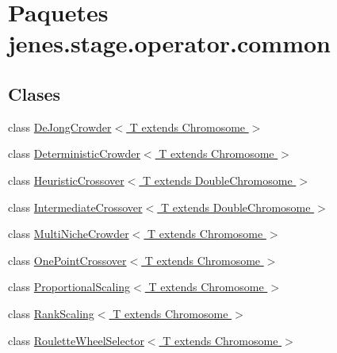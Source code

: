 \hypertarget{namespacejenes_1_1stage_1_1operator_1_1common}{\section{Paquetes jenes.\-stage.\-operator.\-common}
\label{namespacejenes_1_1stage_1_1operator_1_1common}
}
\subsection*{Clases}
\begin{DoxyCompactItemize}
\item 
class \hyperlink{classjenes_1_1stage_1_1operator_1_1common_1_1_de_jong_crowder_3_01_t_01extends_01_chromosome_01_4}{De\-Jong\-Crowder$<$ T extends Chromosome $>$}
\item 
class \hyperlink{classjenes_1_1stage_1_1operator_1_1common_1_1_deterministic_crowder_3_01_t_01extends_01_chromosome_01_4}{Deterministic\-Crowder$<$ T extends Chromosome $>$}
\item 
class \hyperlink{classjenes_1_1stage_1_1operator_1_1common_1_1_heuristic_crossover_3_01_t_01extends_01_double_chromosome_01_4}{Heuristic\-Crossover$<$ T extends Double\-Chromosome $>$}
\item 
class \hyperlink{classjenes_1_1stage_1_1operator_1_1common_1_1_intermediate_crossover_3_01_t_01extends_01_double_chromosome_01_4}{Intermediate\-Crossover$<$ T extends Double\-Chromosome $>$}
\item 
class \hyperlink{classjenes_1_1stage_1_1operator_1_1common_1_1_multi_niche_crowder_3_01_t_01extends_01_chromosome_01_4}{Multi\-Niche\-Crowder$<$ T extends Chromosome $>$}
\item 
class \hyperlink{classjenes_1_1stage_1_1operator_1_1common_1_1_one_point_crossover_3_01_t_01extends_01_chromosome_01_4}{One\-Point\-Crossover$<$ T extends Chromosome $>$}
\item 
class \hyperlink{classjenes_1_1stage_1_1operator_1_1common_1_1_proportional_scaling_3_01_t_01extends_01_chromosome_01_4}{Proportional\-Scaling$<$ T extends Chromosome $>$}
\item 
class \hyperlink{classjenes_1_1stage_1_1operator_1_1common_1_1_rank_scaling_3_01_t_01extends_01_chromosome_01_4}{Rank\-Scaling$<$ T extends Chromosome $>$}
\item 
class \hyperlink{classjenes_1_1stage_1_1operator_1_1common_1_1_roulette_wheel_selector_3_01_t_01extends_01_chromosome_01_4}{Roulette\-Wheel\-Selector$<$ T extends Chromosome $>$}

\end{DoxyCompactItemize}
